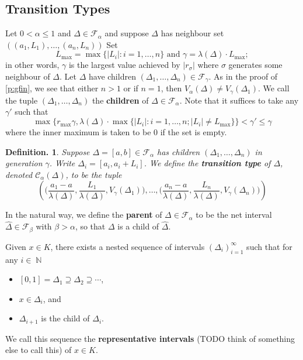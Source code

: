 \documentclass[11pt, a4paper]{memoir}
\DeclareMathOperator{\N}{{\mathbb{N}}}
\theoremstyle{change}
\theoremstyle{plain}
\theoremstyle{nonumberplain}
\newtheorem{definition}{Definition.}
\numberwithin{equation}{section}
\begin{document}
\subsection{Transition Types}
Let $0<\alpha\leq 1$ and $\Delta\in\mathcal{F}_\alpha$ and suppose $\Delta$ has neighbour set $((a_1,L_1),\ldots,(a_n,L_n))$
Set
\begin{equation*}
    L_{\max}=\max\{|L_i|:i=1,\ldots,n\}\text{ and }\gamma = \lambda(\Delta)\cdot L_{\max};
\end{equation*}
in other words, $\gamma$ is the largest value achieved by $|r_\sigma|$ where $\sigma$ generates some neighbour of $\Delta$.
Let $\Delta$ have children $(\Delta_1,\ldots,\Delta_n)\in\mathcal{F}_\gamma$.
As in the proof of \cref{p:gfin}, we see that either $n>1$ or if $n=1$, then $V_\alpha(\Delta)\neq V_\gamma(\Delta_1)$.
We call the tuple $(\Delta_1,\ldots,\Delta_n)$ the \textbf{children} of $\Delta\in\mathcal{F}_\alpha$.
Note that it suffices to take any $\gamma'$ such that
\begin{equation*}
    \max\bigl\{r_{\max}\gamma,\lambda(\Delta)\cdot\max\{|L_i|:i=1,\ldots,n; |L_i|\neq L_{\max}\}\bigr\}<\gamma'\leq\gamma
\end{equation*}
where the inner maximum is taken to be 0 if the set is empty.
\begin{definition}
    Suppose $\Delta=[a,b]\in\mathcal{F}_\alpha$ has children $(\Delta_1,\ldots,\Delta_n)$ in generation $\gamma$.
    Write $\Delta_i=[a_i,a_i+L_i]$.
    We define the \textbf{transition type} of $\Delta$, denoted $\mathcal{C}_\alpha(\Delta)$, to be the tuple
    \begin{equation*}
        \left(\bigl(\frac{a_1-a}{\lambda(\Delta)},\frac{L_1}{\lambda(\Delta)},V_\gamma(\Delta_1)\bigr),\ldots,\bigl(\frac{a_n-a}{\lambda(\Delta)},\frac{L_n}{\lambda(\Delta)},V_\gamma(\Delta_n)\bigr)\right)
    \end{equation*}
\end{definition}
In the natural way, we define the \textbf{parent} of $\Delta\in\mathcal{F}_\alpha$ to be the net interval $\widehat\Delta\in\mathcal{F}_\beta$ with $\beta > \alpha$, so that $\Delta$ is a child of $\widehat\Delta$.

Given $x\in K$, there exists a nested sequence of intervals $(\Delta_i)_{i=1}^\infty$ such that for any $i\in\N$
\begin{itemize}[nl]
    \item $[0,1]=\Delta_1\supseteq\Delta_2\supseteq\cdots$,
    \item $x\in\Delta_i$, and
    \item $\Delta_{i+1}$ is the child of $\Delta_i$.
\end{itemize}
We call this sequence the \textbf{representative intervals} (TODO think of something else to call this) of $x\in K$.
\end{document}
